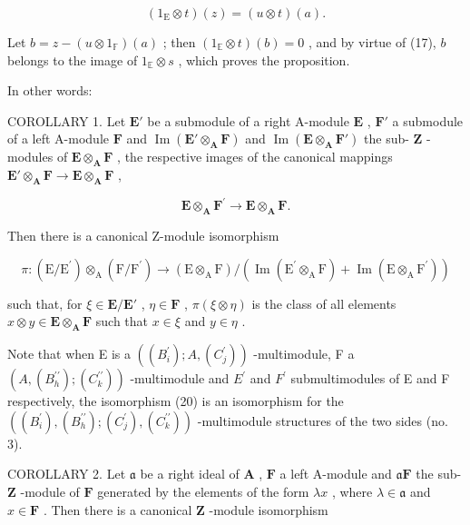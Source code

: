 \[
(1 _ {\mathrm{E}} \otimes t) (z) = (u \otimes t) (a).
\]

Let \(b = z - (u \otimes 1_{\mathbb{F}})(a)\) ; then \((1_{\mathbb{E}} \otimes t)(b) = 0\) , and by virtue of (17), \(b\) belongs to the image of \(1_{\mathbb{E}} \otimes s\) , which proves the proposition.

In other words:

COROLLARY 1. Let \(\mathbf{E}'\) be a submodule of a right A-module \(\mathbf{E}\) , \(\mathbf{F}'\) a submodule of a left A-module \(\mathbf{F}\) and \(\operatorname{Im}(\mathbf{E}' \otimes_{\mathbf{A}} \mathbf{F})\) and \(\operatorname{Im}(\mathbf{E} \otimes_{\mathbf{A}} \mathbf{F}')\) the sub- \(\mathbf{Z}\) -modules of \(\mathbf{E} \otimes_{\mathbf{A}} \mathbf{F}\) , the respective images of the canonical mappings \(\mathbf{E}' \otimes_{\mathbf{A}} \mathbf{F} \to \mathbf{E} \otimes_{\mathbf{A}} \mathbf{F}\) ,

\[
\mathbf {E} \otimes_ {\mathbf {A}} \mathbf {F} ^ {\prime} \rightarrow \mathbf {E} \otimes_ {\mathbf {A}} \mathbf {F}.
\]

Then there is a canonical Z-module isomorphism

\[
\pi : (\mathrm{E} / \mathrm{E} ^ {\prime}) \otimes_ {\mathrm{A}} (\mathrm{F} / \mathrm{F} ^ {\prime}) \rightarrow (\mathrm{E} \otimes_ {\mathrm{A}} \mathrm{F}) / (\operatorname{Im} (\mathrm{E} ^ {\prime} \otimes_ {\mathrm{A}} \mathrm{F}) + \operatorname{Im} (\mathrm{E} \otimes_ {\mathrm{A}} \mathrm{F} ^ {\prime}))\tag{20}
\]

such that, for \(\xi \in \mathbf{E} / \mathbf{E}'\) , \(\eta \in \mathbf{F}\) , \(\pi (\xi \otimes \eta)\) is the class of all elements \(x \otimes y \in \mathbf{E} \otimes_{\mathbf{A}} \mathbf{F}\) such that \(x \in \xi\) and \(y \in \eta\) .

Note that when E is a \(((B_{i}^{\prime}); A, (C_{j}^{\prime}))\) -multimodule, F a \((A, (B_{h}^{\prime\prime}); (C_{k}^{\prime\prime}))\) -multimodule and \(E^{\prime}\) and \(F^{\prime}\) submultimodules of E and F respectively, the isomorphism (20) is an isomorphism for the \(((B_{i}^{\prime}), (B_{h}^{\prime\prime}); (C_{j}^{\prime}), (C_{k}^{\prime\prime}))\) -multimodule structures of the two sides (no. 3).

COROLLARY 2. Let \(\mathfrak{a}\) be a right ideal of \(\mathbf{A}\) , \(\mathbf{F}\) a left A-module and \(\mathfrak{a}\mathbf{F}\) the sub- \(\mathbf{Z}\) -module of \(\mathbf{F}\) generated by the elements of the form \(\lambda x\) , where \(\lambda \in \mathfrak{a}\) and \(x \in \mathbf{F}\) . Then there is a canonical \(\mathbf{Z}\) -module isomorphism

